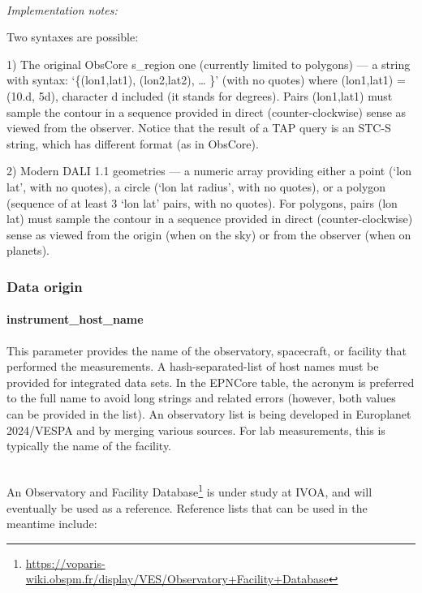\documentclass[11pt,a4paper]{ivoa}
\begin{document}
\textbf{\\}
\emph{Implementation notes:}

Two syntaxes are possible:

1) The original ObsCore s\_region one (currently limited to polygons)
— a string with syntax: `\{(lon1,lat1), (lon2,lat2), … \}' (with
no quotes) where (lon1,lat1) = (10.d, 5d), character d included (it
stands for degrees). Pairs (lon1,lat1) must sample the contour in a
sequence provided in direct (counter-clockwise) sense as viewed from
the observer. Notice that the result of a TAP query is an STC-S string,
which has different format (as in ObsCore).

2) Modern DALI 1.1 geometries — a numeric array providing either a point
(`lon lat', with no quotes), a circle (`lon lat radius', with no quotes),
or a polygon (sequence of at least 3 `lon lat' pairs, with no quotes). For
polygons, pairs (lon lat) must sample the contour in a sequence provided
in direct (counter-clockwise) sense as viewed from the origin (when on
the sky) or from the observer (when on planets).

\subsubsection{Data origin}

\paragraph{instrument\_host\_name}

This parameter provides the name of the observatory, spacecraft, or
facility that performed the measurements. A hash-separated-list of host
names must be provided for integrated data sets. In the EPNCore table, the
acronym is preferred to the full name to avoid long strings and related
errors (however, both values can be provided in the list). An observatory list
is being developed in Europlanet 2024/VESPA and by merging various sources.
For lab measurements, this is typically the name of the facility.

\textbf{\\}
An Observatory and Facility
Database\footnote{\url{https://voparis-wiki.obspm.fr/display/VES/Observatory+Facility+Database}}
is under study at IVOA, and will eventually be used as a reference.
Reference lists that can be used in the meantime include:
\end{document}
